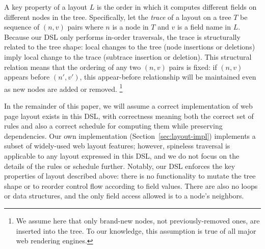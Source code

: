 A key property of a layout $L$
  is the order in which it computes
  different fields on different nodes in the tree.
Specifically, let the \emph{trace} of a layout on a tree $T$
  be sequence of $(n, v)$ pairs
  where $n$ is a node in $T$ and $v$ is a field name in $L$.
Because our DSL only performs in-order traversals,
  the trace is structurally related to the tree shape:
  local changes to the tree (node insertions or deletions)
  imply local change to the trace (subtrace insertion or deletion).
This structural relation means
  that the ordering of any two $(n, v)$ pairs is fixed:
  if $(n, v)$ appears before $(n', v')$,
  this appear-before relationship
  will be maintained even as new nodes are added or removed.%
\footnote{
  We assume here that
    only brand-new nodes, not previously-removed ones,
    are inserted into the tree.
  To our knowledge, this assumption is true
    of all major web rendering engines.
}

In the remainder of this paper,
  we will assume a correct implementation
  of web page layout exists in this DSL,
  with correctness meaning both the correct set of rules
  and also a correct schedule for computing them
  while preserving dependencies.
Our own implementation (Section~\ref{sec:layout-impl})
  implements a subset of widely-used web layout features;
  however, spineless traversal is applicable
  to any layout expressed in this DSL,
  and we do not focus on the details
  of the rules or schedule further.
Notably, our DSL enforces
  the key properties of layout described above:
  there is no functionality to mutate the tree shape
  or to reorder control flow according to field values.
There are also no loops or data structures,
  and the only field access allowed is to a node's neighbors.

